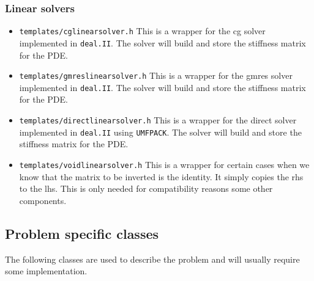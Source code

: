 \subsubsection{Linear solvers}
\begin{itemize}
\item \texttt{templates/cglinearsolver.h} This is a wrapper for the cg solver implemented in 
  \texttt{deal.II}. The solver will build and store the stiffness matrix for the PDE.
\item \texttt{templates/gmreslinearsolver.h} This is a wrapper for the gmres solver 
  implemented in \texttt{deal.II}. The solver will build and store the stiffness matrix 
  for the PDE.
\item \texttt{templates/directlinearsolver.h} This is a wrapper for the direct solver 
  implemented in \texttt{deal.II} using \texttt{UMFPACK}. 
  The solver will build and store the stiffness matrix for the PDE.
\item \texttt{templates/voidlinearsolver.h} This is a wrapper for certain cases when we 
  know that the matrix to be inverted is the identity. It simply copies the rhs to the
  lhs. This is only needed for compatibility reasons some other components.
\end{itemize}



\subsection{Problem specific classes}
The following classes are used to describe the problem and will usually require 
some implementation.

